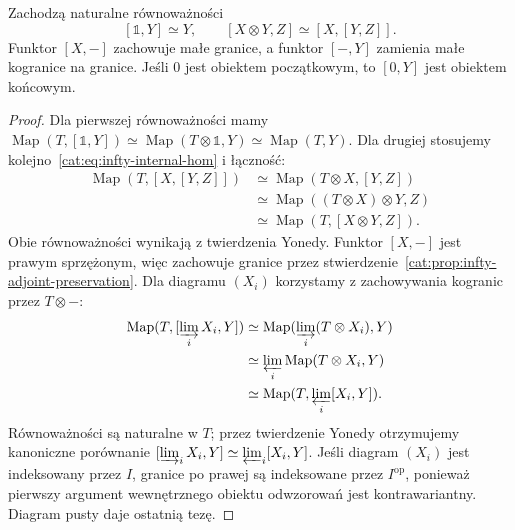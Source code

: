 \begin{stwierdzenie}\label{cat:prop:infty-internal-hom-laws}
Zachodzą naturalne równoważności
\[
 [\mathbb 1,Y]\simeq Y,\qquad
 [X\otimes Y,Z]\simeq[X,[Y,Z]].
\]
Funktor $[X,-]$ zachowuje małe granice, a funktor $[-,Y]$ zamienia małe kogranice na granice. Jeśli $0$ jest obiektem początkowym, to $[0,Y]$ jest obiektem końcowym.
\end{stwierdzenie}
\begin{proof}
Dla pierwszej równoważności mamy $\operatorname{Map}(T,[\mathbb 1,Y])\simeq\operatorname{Map}(T\otimes\mathbb 1,Y)\simeq\operatorname{Map}(T,Y)$. Dla drugiej stosujemy kolejno~\eqref{cat:eq:infty-internal-hom} i łączność:
\[
\begin{aligned}
 \operatorname{Map}(T,[X,[Y,Z]])
 &\simeq\operatorname{Map}(T\otimes X,[Y,Z])\\
 &\simeq\operatorname{Map}((T\otimes X)\otimes Y,Z)\\
 &\simeq\operatorname{Map}(T,[X\otimes Y,Z]).
\end{aligned}
\]
Obie równoważności wynikają z twierdzenia Yonedy. Funktor $[X,-]$ jest prawym sprzężonym, więc zachowuje granice przez stwierdzenie~\ref{cat:prop:infty-adjoint-preservation}. Dla diagramu $(X_i)$ korzystamy z zachowywania kogranic przez $T\otimes-$:
\[
\begin{aligned}
 \operatorname{Map}(T,[\varinjlim_i X_i,Y])
 &\simeq\operatorname{Map}(\varinjlim_i(T\otimes X_i),Y)\\
 &\simeq\varprojlim_i\operatorname{Map}(T\otimes X_i,Y)\\
 &\simeq\operatorname{Map}(T,\varprojlim_i[X_i,Y]).
\end{aligned}
\]
Równoważności są naturalne w $T$; przez twierdzenie Yonedy otrzymujemy kanoniczne porównanie $[\varinjlim_i X_i,Y]\simeq\varprojlim_i[X_i,Y]$. Jeśli diagram $(X_i)$ jest indeksowany przez $I$, granice po prawej są indeksowane przez $I^{\mathrm{op}}$, ponieważ pierwszy argument wewnętrznego obiektu odwzorowań jest kontrawariantny. Diagram pusty daje ostatnią tezę.
\end{proof}

